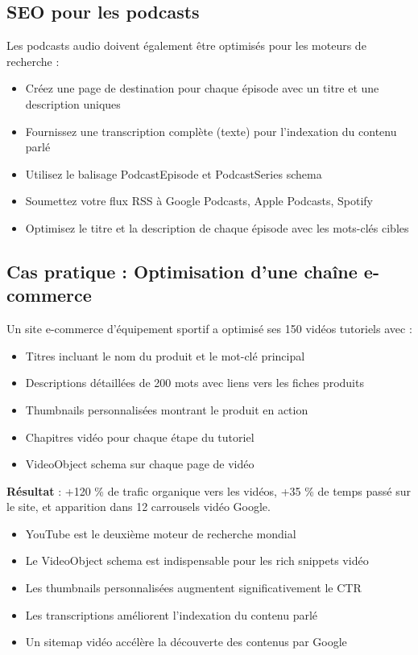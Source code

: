 \documentclass[12pt,a4paper,twoside]{report}
\begin{document}
\subsection{SEO pour les podcasts}

Les podcasts audio doivent également être optimisés pour les moteurs de recherche :
\begin{itemize}
    \item Créez une page de destination pour chaque épisode avec un titre et une description uniques
    \item Fournissez une transcription complète (texte) pour l'indexation du contenu parlé
    \item Utilisez le balisage PodcastEpisode et PodcastSeries schema
    \item Soumettez votre flux RSS à Google Podcasts, Apple Podcasts, Spotify
    \item Optimisez le titre et la description de chaque épisode avec les mots-clés cibles
\end{itemize}

\subsection{Cas pratique : Optimisation d'une chaîne e-commerce}

Un site e-commerce d'équipement sportif a optimisé ses 150 vidéos tutoriels avec :
\begin{itemize}
    \item Titres incluant le nom du produit et le mot-clé principal
    \item Descriptions détaillées de 200 mots avec liens vers les fiches produits
    \item Thumbnails personnalisées montrant le produit en action
    \item Chapitres vidéo pour chaque étape du tutoriel
    \item VideoObject schema sur chaque page de vidéo
\end{itemize}
\textbf{Résultat} : +120 \% de trafic organique vers les vidéos, +35 \% de temps passé sur le site, et apparition dans 12 carrousels vidéo Google.

\begin{takeaways}
\begin{itemize}
    \item YouTube est le deuxième moteur de recherche mondial
    \item Le VideoObject schema est indispensable pour les rich snippets vidéo
    \item Les thumbnails personnalisées augmentent significativement le CTR
    \item Les transcriptions améliorent l'indexation du contenu parlé
    \item Un sitemap vidéo accélère la découverte des contenus par Google
\end{itemize}
\end{takeaways}
\end{document}

